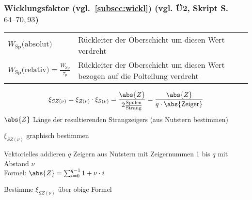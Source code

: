 \begin{sectionbox}
\subsubsection{Wicklungsfaktor (vgl.~\ref{subsec:wickl}) (vgl. Ü2, Skript S. $\numrange{64}{70},93$)}
\begin{tabularx}{\columnwidth}{lX}
$W_\text{Sp}\text{(absolut)}$ & Rückleiter der Oberschicht um diesen Wert verdreht\\
$W_\text{Sp}\text{(relativ)} = \frac{W_\text{Sp}}{\tau_p}$ & Rückleiter der Oberschicht um diesen Wert bezogen auf die Polteilung verdreht
\end{tabularx}
\[\xi_{SZ(\nu)} = \xi_{Z(\nu)}\cdot\xi_{S(\nu)} = \frac{\abs{Z}}{2\frac{\text{Spulen}}{\text{Strang}}}  = \frac{\abs{Z}}{q\cdot \abs{\text{Zeiger}}}\]
$\abs{Z}$ Länge der resultierenden Strangzeigers (aus Nutstern bestimmen)
\begin{cookbox}{$\xi_{SZ(\nu)}$ graphisch bestimmen}
\item Vektorielles addieren $q$ Zeigern aus Nutstern mit Zeigernummen 1 bis $q$ mit Abstand $\nu$\\
Formel: $\abs{Z} = \sum_{i=0}^{q-1} 1 + \nu\cdot i$
\item Bestimme $\xi_{SZ(\nu)}$ über obige Formel
\end{cookbox}
\end{sectionbox}

